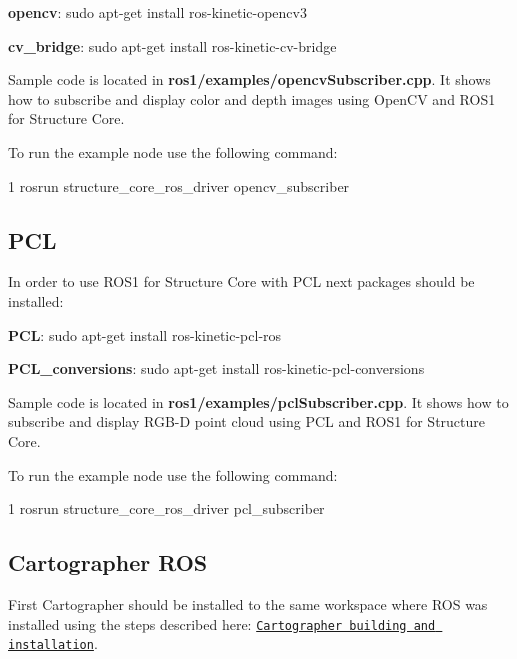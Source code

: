 \begin{DoxyItemize}
\item {\bfseries opencv}\+: sudo apt-\/get install ros-\/kinetic-\/opencv3
\item {\bfseries cv\+\_\+bridge}\+: sudo apt-\/get install ros-\/kinetic-\/cv-\/bridge
\end{DoxyItemize}

Sample code is located in {\bfseries ros1/examples/opencv\+Subscriber.\+cpp}. It shows how to subscribe and display color and depth images using Open\+CV and R\+O\+S1 for Structure Core.

To run the example node use the following command\+:


\begin{DoxyCode}
1 rosrun structure\_core\_ros\_driver opencv\_subscriber
\end{DoxyCode}
\hypertarget{ros_start_pcl}{}\subsection{P\+CL}\label{ros_start_pcl}
In order to use R\+O\+S1 for Structure Core with P\+CL next packages should be installed\+:


\begin{DoxyItemize}
\item {\bfseries P\+CL}\+: sudo apt-\/get install ros-\/kinetic-\/pcl-\/ros
\item {\bfseries P\+C\+L\+\_\+conversions}\+: sudo apt-\/get install ros-\/kinetic-\/pcl-\/conversions
\end{DoxyItemize}

Sample code is located in {\bfseries ros1/examples/pcl\+Subscriber.\+cpp}. It shows how to subscribe and display R\+G\+B-\/D point cloud using P\+CL and R\+O\+S1 for Structure Core.

To run the example node use the following command\+:


\begin{DoxyCode}
1 rosrun structure\_core\_ros\_driver pcl\_subscriber
\end{DoxyCode}
\hypertarget{ros_start_cartographer}{}\subsection{Cartographer R\+OS}\label{ros_start_cartographer}
First Cartographer should be installed to the same workspace where R\+OS was installed using the steps described here\+: \href{https://google-cartographer-ros.readthedocs.io/en/latest/compilation.html}{\tt Cartographer building and installation}.

